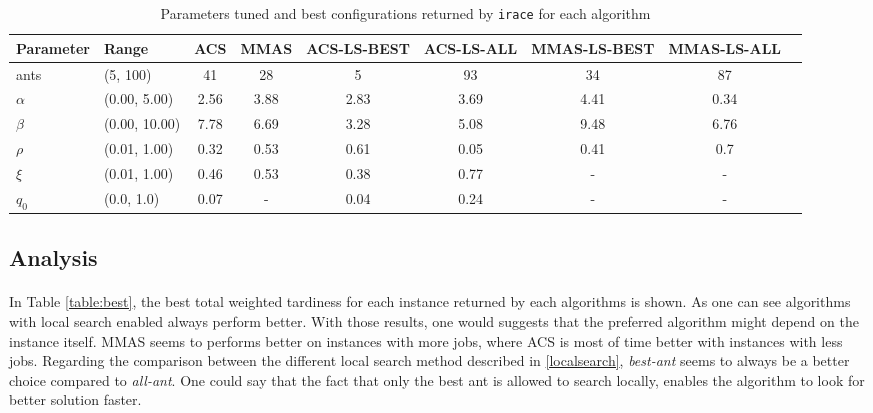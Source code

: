 \documentclass[runningheads]{llncs}
\begin{document}
\begin{table}[]
\centering
\begin{tabular}{ | l | l | c | c | c | c | c | c | c | }
  \hline
  Parameter    & Range          & ACS    & MMAS    & ACS-LS-BEST & ACS-LS-ALL & MMAS-LS-BEST & MMAS-LS-ALL \\
  \hline
  ants         & (5, 100)       & 41     & 28      & 5        &  93   & 34  & 87 \\
  \hline
  $\alpha$        & (0.00, 5.00)   & 2.56   & 3.88    & 2.83     &  3.69    &   4.41     & 0.34 \\
  \hline
  $\beta$         & (0.00, 10.00)  & 7.78   & 6.69    & 3.28     &  5.08     & 9.48      & 6.76 \\
  \hline
  $\rho$          & (0.01, 1.00)   & 0.32   & 0.53    & 0.61     &  0.05      &   0.41     & 0.7 \\
  \hline
  $\xi$          & (0.01, 1.00)   & 0.46    & 0.53    & 0.38     &  0.77     &       -      & - \\
  \hline
  $q_0$           & (0.0, 1.0)     & 0.07   & -       & 0.04     &  0.24    &       -      & - \\
  \hline

\end{tabular}
\caption{Parameters tuned and best configurations returned by \texttt{irace} for each algorithm}
\label{table:irace}
\end{table}

\subsection{Analysis}

\paragraph{}

In Table \ref{table:best}, the best total weighted tardiness for each instance returned by each algorithms is shown. As one can see algorithms with local search enabled always perform better. With those results, one would suggests that the preferred algorithm might depend on the instance itself. MMAS seems to performs better on instances with more jobs, where ACS is most of time better with instances with less jobs. Regarding the comparison between the different local search method described in \ref{localsearch}, \textit{best-ant} seems to always be a better choice compared to \textit{all-ant}. One could say that the fact that only the best ant is allowed to search locally, enables the algorithm to look for better solution faster.
\end{document}
